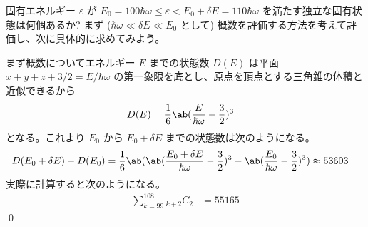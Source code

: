 \documentclass[uplatex,dvipdfmx,a4paper,11pt]{jlreq}
\makeatletter
\numberwithin{equation}{section}
\theoremstyle{definition}
\renewenvironment{proof}[1][\proofname]{\par
  \normalfont
  \topsep6\p@\@plus6\p@ \trivlist
  \item[\hskip\labelsep{\bfseries #1}\@addpunct{\bfseries}]\ignorespaces\quad\par
}{%
  \qed\endtrivlist\@endpefalse
}
\renewcommand\proofname{証明}
\makeatother
\begin{document}
\begin{problem}
固有エネルギー $\varepsilon$ が $E_0 = 100\hbar\omega \leq \varepsilon < E_0 + \delta E = 110\hbar\omega$ を満たす独立な固有状態は何個あるか? まず ($\hbar\omega\ll \delta E \ll E_0$ として) 概数を評価する方法を考えて評価し、次に具体的に求めてみよう。
\end{problem}
\begin{proof}
  まず概数についてエネルギー $E$ までの状態数 $D(E)$ は平面 $x + y + z + 3/2 = E/\hbar\omega$ の第一象限を底とし、原点を頂点とする三角錐の体積と近似できるから
  \begin{align}
    D(E) & = \frac{1}{6}\ab(\frac{E}{\hbar\omega} - \frac{3}{2})^3
  \end{align}
  となる。これより $E_0$ から $E_0 + \delta E$ までの状態数は次のようになる。
  \begin{align}
    D(E_0 + \delta E) - D(E_0) & = \frac{1}{6}\ab(\ab(\frac{E_0 + \delta E}{\hbar\omega} - \frac{3}{2})^3 - \ab(\frac{E_0}{\hbar\omega} - \frac{3}{2})^3) \approx 53603
  \end{align}
  実際に計算すると次のようになる。
  \begin{align}
    \sum_{k=99}^{108}{}_{k+2}C_{2} & = 55165
  \end{align}
\end{proof}
\end{document}
